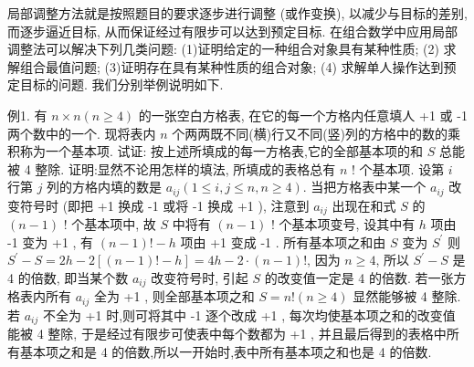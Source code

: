 
局部调整方法就是按照题目的要求逐步进行调整 (或作变换), 以减少与目标的差别, 而逐步逼近目标, 从而保证经过有限步可以达到预定目标.
在组合数学中应用局部调整法可以解决下列几类问题:
(1)证明给定的一种组合对象具有某种性质;
(2) 求解组合最值问题;
(3)证明存在具有某种性质的组合对象;
(4) 求解单人操作达到预定目标的问题.
我们分别举例说明如下.



例1. 有 $n \times n(n \geqslant 4)$ 的一张空白方格表, 在它的每一个方格内任意填人 +1 或 -1 两个数中的一个.
现将表内 $n$ 个两两既不同(横)行又不同(竖)列的方格中的数的乘积称为一个基本项.
试证: 按上述所填成的每一方格表,它的全部基本项的和 $S$ 总能被 4 整除.
证明:显然不论用怎样的填法, 所填成的表格总有 $n$ ! 个基本项.
设第 $i$ 行第 $j$ 列的方格内填的数是 $a_{i j}(1 \leqslant i, j \leqslant n, n \geqslant 4)$. 当把方格表中某一个 $a_{i j}$ 改变符号时 (即把 +1 换成 -1 或将 -1 换成 +1 ), 注意到 $a_{i j}$ 出现在和式 $S$ 的 $(n-1)$ ! 个基本项中, 故 $S$ 中将有 $(n-1)$ ! 个基本项变号, 设其中有 $h$ 项由 -1 变为 +1 , 有 $(n-1) !-h$ 项由 +1 变成 -1 . 所有基本项之和由 $S$ 变为 $S^{\prime}$ 则 $S^{\prime}-S=2 h-2[(n-1) !-h]=4 h-2 \cdot(n-1) !$, 因为 $n \geqslant 4$, 所以 $S^{\prime}-S$ 是 4 的倍数, 即当某个数 $a_{i j}$ 改变符号时, 引起 $S$ 的改变值一定是 4 的倍数.
若一张方格表内所有 $a_{i j}$ 全为 +1 , 则全部基本项之和 $S=n !(n \geqslant 4)$ 显然能够被 4 整除.
若 $a_{i j}$ 不全为 +1 时,则可将其中 -1 逐个改成 +1 , 每次均使基本项之和的改变值能被 4 整除, 于是经过有限步可使表中每个数都为 +1 , 并且最后得到的表格中所有基本项之和是 4 的倍数,所以一开始时,表中所有基本项之和也是 4 的倍数.



